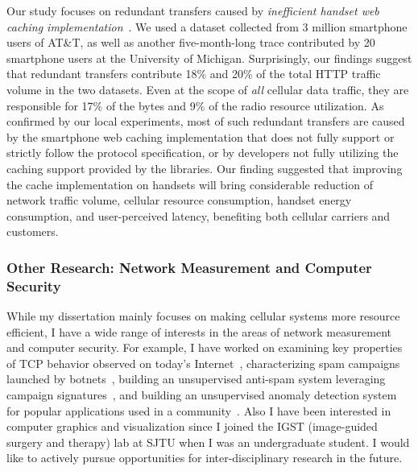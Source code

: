 \documentclass[10pt]{article}
\begin{document}
\begin{small}
Our study focuses on redundant transfers caused by \emph{inefficient handset web caching implementation}~\cite{qian12_mobisys}. We used a dataset collected from 3 million smartphone users of AT\&T, as well as another five-month-long trace contributed by 20 smartphone users at the University of Michigan. Surprisingly, our findings suggest that redundant transfers contribute 18\% and 20\% of the total HTTP traffic volume in the two datasets. Even at the scope of \emph{all} cellular data traffic, they are responsible for 17\% of the bytes and 9\% of the radio resource utilization. As confirmed by our local experiments, most of such redundant transfers are caused by the smartphone web caching implementation that does not fully support or strictly follow the protocol specification, or by developers not fully utilizing the caching support provided by the libraries. Our finding suggested that improving the cache implementation on handsets will bring considerable reduction of network traffic volume, cellular resource consumption, handset energy consumption, and user-perceived latency, benefiting both cellular carriers and customers.




\subsubsection*{Other Research: Network Measurement and Computer Security}

While my dissertation mainly focuses on making cellular systems more resource efficient, I have a wide range of interests in the areas of network measurement and computer security. For example, I have worked on examining key properties of TCP behavior observed on today's Internet~\cite{qian09}, characterizing spam campaigns launched by botnets~\cite{pathaksigm09}, building an unsupervised anti-spam system leveraging campaign signatures~\cite{qian10_sigm}, and building an unsupervised anomaly detection system for popular applications used in a community~\cite{ensemble}. Also I have been interested in computer graphics and visualization since I joined the IGST (image-guided surgery and therapy) lab at SJTU when I was an undergraduate student. I would like to actively pursue opportunities for inter-disciplinary research in the future.


\end{small}
\end{document}
